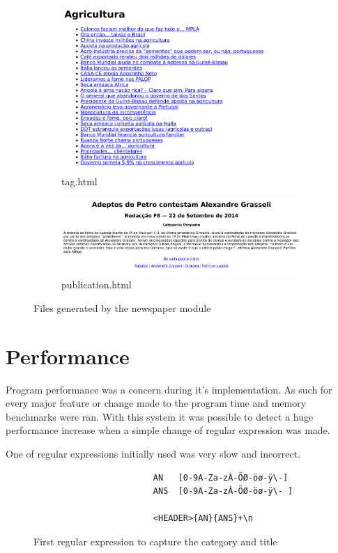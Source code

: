 \documentclass[a4paper]{report}
\begin{document}
\begin{figure}[H]
\begin{subfigure}{0.45\textwidth}
    \end{subfigure}
    \begin{subfigure}{0.45\textwidth}
        \includegraphics[width=\textwidth]{./tag_print.png}
        \caption{tag.html}
    \end{subfigure}
    \begin{subfigure}{0.54\textwidth}
        \includegraphics[width=\textwidth]{./publication_print.png}
        \caption{publication.html}
    \end{subfigure}
    \caption{Files generated by the newspaper module}
\end{figure}

\chapter{Performance}

Program performance was a concern during it's implementation. As such for every
major feature or change made to the program time and memory benchmarks were
ran. With this system it was possible to detect a huge performance increase
when a simple change of regular expression was made.

One of regular expressions initially used was very slow and incorrect.
\begin{figure}[H]
    \centering
    \begin{verbatim}
                        AN   [0-9A-Za-zÀ-ÖØ-öø-ÿ\-]
                        ANS  [0-9A-Za-zÀ-ÖØ-öø-ÿ\- ]

                        <HEADER>{AN}{ANS}+\n
    \end{verbatim}
    \caption{First regular expression to capture the category and title}
\end{figure}
\end{document}
